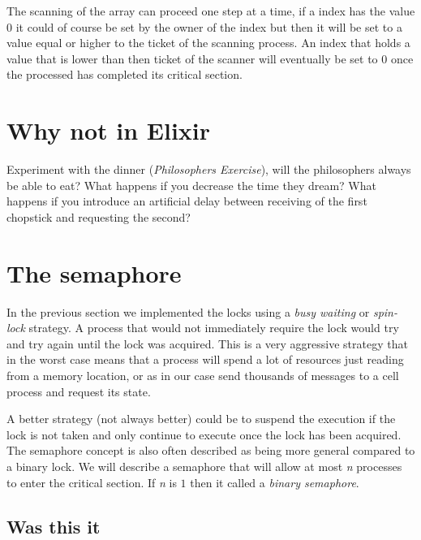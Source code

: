 \documentclass[a4paper,11pt]{article}
\begin{document}
The scanning of the array can proceed one step at a time, if a index
has the value $0$
it could of course be set by the owner of the index but then it will be
set to a value equal or higher to the ticket of the scanning
process. An index that holds a value that is lower than then ticket of
the scanner will eventually be set to $0$
once the processed has completed its critical section. 



\section{Why not in Elixir}

Experiment with the dinner ({\em Philosophers Exercise}), will the philosophers always be able to
eat? What happens if you decrease the time they dream? What happens if
you introduce an artificial delay between receiving of the first
chopstick and requesting the second?



\section{The semaphore}

In the previous section we implemented the locks using a {\em busy
  waiting} or {\em spin-lock} strategy. A process that would not
immediately require the lock would try and try again until the lock
was acquired. This is a very aggressive strategy that in the worst case
means that a process will spend a lot of resources just reading from a
memory location, or as in our case send thousands of messages to a
cell process and request its state.

A better strategy (not always better) could be to suspend the
execution if the lock is not taken and only continue to execute once
the lock has been acquired. The semaphore concept is also often
described as being more general compared to a binary lock. We will
describe a semaphore that will allow at most {\em n} processes to
enter the critical section. If {\em n} is $1$
then it called a {\em binary semaphore}.


\subsection{Was this it}
\end{document}
